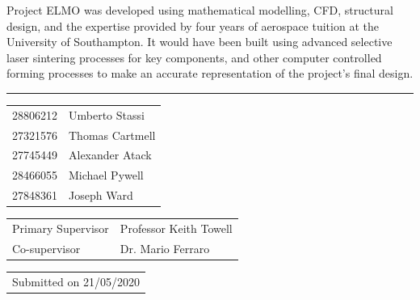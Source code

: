 \documentclass[11pt,landscape]{report}
\newcommand{\appendixtable}[2]{
    \begin{table}[H]
        \begin{tabular}{#1}
            #2
        \end{tabular}
    \end{table}
}
\begin{document}
\begin{multicols*}{2}
\begin{titlepage}
{        Project ELMO was developed using mathematical modelling, CFD, structural design, and the expertise provided by four years of aerospace tuition at the University of Southampton.
        It would have been built using advanced selective laser sintering processes for key components, and other computer controlled forming processes to make an accurate representation of the project's final design. 
    } %
    \par\noindent\rule{\columnwidth}{0.4pt}
    \appendixtable{l l}{
        28806212 & Umberto Stassi \\
        27321576 & Thomas Cartmell \\
        27745449 & Alexander Atack \\
        28466055 & Michael Pywell \\
        27848361 & Joseph Ward \\
    }
    \appendixtable{l l}{
        Primary Supervisor & Professor Keith Towell \\
        Co-supervisor & Dr. Mario Ferraro \\
    }
    \appendixtable{l}{Submitted on 21/05/2020}

\end{titlepage}
\end{multicols*}
\end{document}
